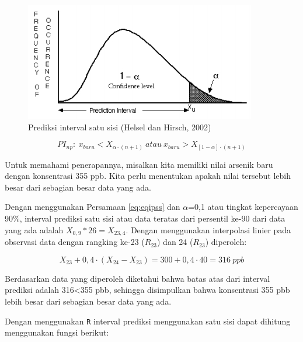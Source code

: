 \documentclass[]{book}
\begin{document}
\begin{figure}

{\centering \includegraphics[width=0.65\linewidth]{ipss} 

}

\caption{Prediksi interval satu sisi (Helsel dan Hirsch, 2002)}\label{fig:ipss}
\end{figure}

\begin{equation}
  PI_{np}:\ x_{baru}<X_{\alpha\cdot\left(n+1\right)}\ atau\ x_{baru}>X_{\left[1-\alpha\right]\cdot\left(n+1\right)}
  \label{eq:eqipss}
\end{equation}

Untuk memahami penerapannya, misalkan kita memiliki nilai arsenik baru
dengan konsentrasi 355 ppb. Kita perlu menentukan apakah nilai tersebut
lebih besar dari sebagian besar data yang ada.

Dengan menggunakan Persamaan \eqref{eq:eqipss} dan \(\alpha\)=0,1 atau
tingkat kepercayaan 90\%, interval prediksi satu sisi atau data teratas
dari persentil ke-90 dari data yang ada adalah \(X_{0,9}*26=X_{23,4}\).
Dengan menggunakan interpolasi linier pada observasi data dengan
rangking ke-23 (\(R_{23}\)) dan 24 (\(R_{23}\)) diperoleh:

\[
  X_{23}+0,4\cdot\left(X_{24}-X_{23}\right)=300+0,4\cdot40=316\ ppb
\]

Berdasarkan data yang diperoleh diketahui bahwa batas atas dari interval
prediksi adalah 316\textless{}355 pbb, sehingga disimpulkan bahwa
konsentrasi 355 pbb lebih besar dari sebagian besar data yang ada.

Dengan menggunakan \texttt{R} interval prediksi menggunakan satu sisi
dapat dihitung menggunakan fungsi berikut:
\end{document}
